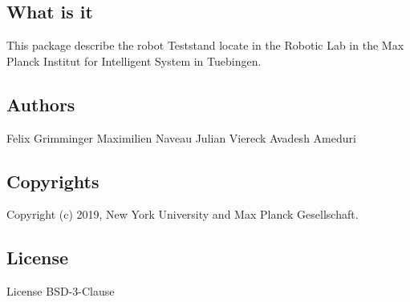 \subsection*{What is it}

This package describe the robot Teststand locate in the Robotic Lab in the Max Planck Institut for Intelligent System in Tuebingen.

\subsection*{Authors}

Felix Grimminger Maximilien Naveau Julian Viereck Avadesh Ameduri

\subsection*{Copyrights}

Copyright (c) 2019, New York University and Max Planck Gesellschaft.

\subsection*{License}

License B\+S\+D-\/3-\/\+Clause 